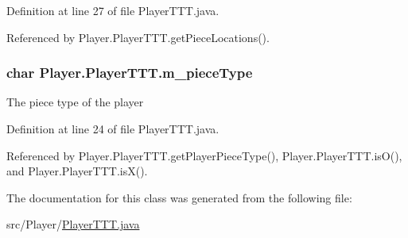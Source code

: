 Definition at line 27 of file Player\+T\+T\+T.\+java.



Referenced by Player.\+Player\+T\+T\+T.\+get\+Piece\+Locations().

\hypertarget{class_player_1_1_player_t_t_t_a2fa13b6b056d666ea9943ca84862ec69}{}
\subsubsection[{m\+\_\+piece\+Type}]{\setlength{\rightskip}{0pt plus 5cm}char Player.\+Player\+T\+T\+T.\+m\+\_\+piece\+Type\hspace{0.3cm}{\ttfamily [private]}}\label{class_player_1_1_player_t_t_t_a2fa13b6b056d666ea9943ca84862ec69}
The piece type of the player 

Definition at line 24 of file Player\+T\+T\+T.\+java.



Referenced by Player.\+Player\+T\+T\+T.\+get\+Player\+Piece\+Type(), Player.\+Player\+T\+T\+T.\+is\+O(), and Player.\+Player\+T\+T\+T.\+is\+X().



The documentation for this class was generated from the following file\+:\begin{DoxyCompactItemize}
\item 
src/\+Player/\hyperlink{_player_t_t_t_8java}{Player\+T\+T\+T.\+java}\end{DoxyCompactItemize}
